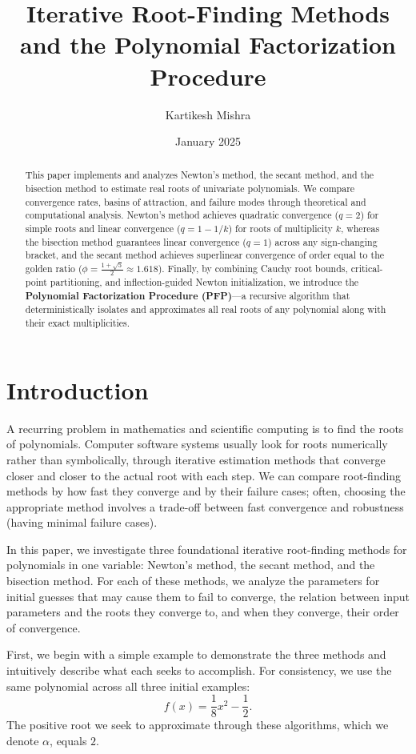 \documentclass{amsart}
\title{Iterative Root-Finding Methods and the Polynomial Factorization Procedure}
\author{Kartikesh Mishra}
\date{January 2025}
\begin{document}
\maketitle

\begin{abstract}
This paper implements and analyzes Newton's method, the secant method, and the bisection method to estimate real roots of univariate polynomials. We compare convergence rates, basins of attraction, and failure modes through theoretical and computational analysis. Newton's method achieves quadratic convergence ($q = 2$) for simple roots and linear convergence ($q = 1 - 1/k$) for roots of multiplicity $k$, whereas the bisection method guarantees linear convergence ($q = 1$) across any sign-changing bracket, and the secant method achieves superlinear convergence of order equal to the golden ratio ($\phi = \frac{1+\sqrt{5}}{2} \approx 1.618$). Finally, by combining Cauchy root bounds, critical-point partitioning, and inflection-guided Newton initialization, we introduce the \textbf{Polynomial Factorization Procedure (PFP)}---a recursive algorithm that deterministically isolates and approximates all real roots of any polynomial along with their exact multiplicities.
\end{abstract}

\section{Introduction}\label{sec_intro}

A recurring problem in mathematics and scientific computing is to find the roots of polynomials. Computer software systems usually look for roots numerically rather than symbolically, through iterative estimation methods that converge closer and closer to the actual root with each step. We can compare root-finding methods by how fast they converge and by their failure cases; often, choosing the appropriate method involves a trade-off between fast convergence and robustness (having minimal failure cases).

In this paper, we investigate three foundational iterative root-finding methods for polynomials in one variable: Newton's method, the secant method, and the bisection method. For each of these methods, we analyze the parameters for initial guesses that may cause them to fail to converge, the relation between input parameters and the roots they converge to, and when they converge, their order of convergence.

First, we begin with a simple example to demonstrate the three methods and intuitively describe what each seeks to accomplish. For consistency, we use the same polynomial across all three initial examples:
\[
    f(x) = \frac{1}{8}x^2 - \frac{1}{2}.
\]
The positive root we seek to approximate through these algorithms, which we denote $\alpha$, equals $2$.
\end{document}
